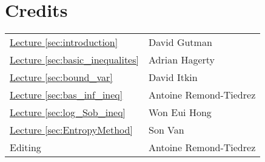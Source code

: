 \documentclass[reqno]{amsproc}
\newcommand{\fref}[2]{\hyperref[#2]{#1 \ref*{#2}}}
\begin{document}
\section*{Credits}
	\begin{tabular}{ll}
		\fref{Lecture}{sec:introduction}& David Gutman\\
		\fref{Lecture}{sec:basic_inequalites}& Adrian Hagerty\\
		\fref{Lecture}{sec:bound_var}& David Itkin\\
		\fref{Lecture}{sec:bas_inf_ineq}& Antoine Remond-Tiedrez\\
		\fref{Lecture}{sec:log_Sob_ineq}& Won Eui Hong \\
		\fref{Lecture}{sec:EntropyMethod}& Son Van \\
		Editing& Antoine Remond-Tiedrez
	\end{tabular}



\end{document}
